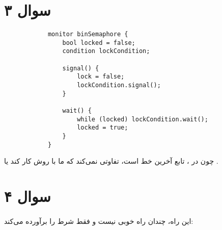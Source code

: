 \documentclass{article}
\begin{document}
	\section*{سوال ۳}
	\paragraph*{}

	\begin{latin}
		\begin{lstlisting}
			monitor binSemaphore {
				bool locked = false;
				condition lockCondition;

				signal() {
					lock = false;
					lockCondition.signal();
				}

				wait() {
					while (locked) lockCondition.wait();
					locked = true;
				}
			}
		\end{lstlisting}
	\end{latin}

	چون در
	،
	تابع
	آخرین خط است، تفاوتی نمی‌کند که
	ما با روش
	کار کند یا
	.

	\section*{سوال ۴}
	\paragraph*{}
	این راه، چندان راه خوبی نیست و فقط شرط
	را برآورده می‌کند:
\end{document}
